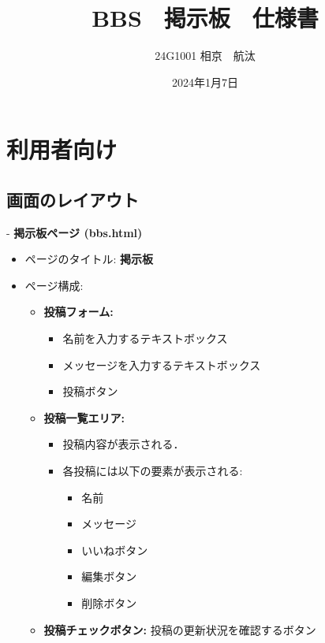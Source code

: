 \documentclass[uplatex,dvipdfmx]{jsarticle}
\begin{document}
\title{BBS　掲示板　仕様書}
\author{24G1001 相京　航汰}
\date{2024年1月7日}
\maketitle

\section{利用者向け}

\subsection*{画面のレイアウト}
- \textbf{掲示板ページ (bbs.html)}
  \begin{itemize}
    \item ページのタイトル: \textbf{掲示板}
    \item ページ構成:
      \begin{itemize}
        \item \textbf{投稿フォーム:}
          \begin{itemize}
            \item 名前を入力するテキストボックス
            \item メッセージを入力するテキストボックス
            \item 投稿ボタン
          \end{itemize}
        \item \textbf{投稿一覧エリア:}
          \begin{itemize}
            \item 投稿内容が表示される．
            \item 各投稿には以下の要素が表示される:
              \begin{itemize}
                \item 名前
                \item メッセージ
                \item いいねボタン
                \item 編集ボタン
                \item 削除ボタン
              \end{itemize}
          \end{itemize}
        \item \textbf{投稿チェックボタン:} 投稿の更新状況を確認するボタン
      \end{itemize}
  \end{itemize}
\end{document}
